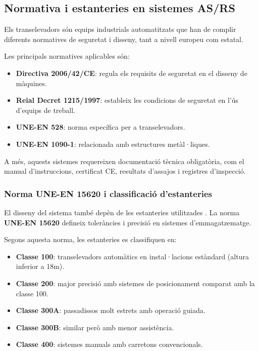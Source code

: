 \documentclass[a4paper,11pt,DIV=13,headings=normal,abstract=true,twoside=semi]{article}
\begin{document}
\subsection{Normativa i estanteries en sistemes AS/RS}

Els transelevadors són equips industrials automatitzats que han de complir diferents normatives de seguretat i disseny, tant a nivell europeu com estatal.

Les principals normatives aplicables \cite{manual_logistica} són:

\begin{itemize}
    \item \textbf{Directiva 2006/42/CE}: regula els requisits de seguretat en el disseny de màquines.
    \item \textbf{Reial Decret 1215/1997}: estableix les condicions de seguretat en l'ús d'equips de treball.
    \item \textbf{UNE-EN 528}: norma específica per a transelevadors.
    \item \textbf{UNE-EN 1090-1}: relacionada amb estructures metàl·liques.
\end{itemize}

A més, aquests sistemes requereixen documentació tècnica obligatòria, com el manual d'instruccions, certificat CE, resultats d'assajos i registres d'inspecció.

\subsubsection{Norma UNE-EN 15620 i classificació d'estanteries}

El disseny del sistema també depèn de les estanteries utilitzades \cite{rack_estanterias_norma}. La norma \textbf{UNE-EN 15620} defineix toleràncies i precisió en sistemes d'emmagatzematge.

Segons aquesta norma, les estanteries es classifiquen en:

\begin{itemize}
    \item \textbf{Classe 100}: transelevadors automàtics en instal·lacions estàndard (altura inferior a 18m).
    \item \textbf{Classe 200}: major precisió amb sistemes de posicionament comparat amb la classe 100.
    \item \textbf{Classe 300A}: passadissos molt estrets amb operació guiada.
    \item \textbf{Classe 300B}: similar però amb menor assistència.
    \item \textbf{Classe 400}: sistemes manuals amb carretons convencionals.
\end{itemize}
\end{document}
